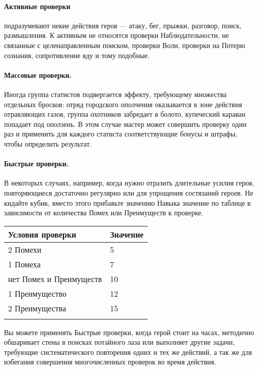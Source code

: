 \paragraph{Активные проверки} подразумевают некие действия героя — атаку, бег, прыжки, разговор, поиск, размышления. К активным не относятся проверки Наблюдательности, не связанные с целенаправленным поиском, проверки Воли, проверки на Потерю сознания, сопротивление яду и тому подобные.
{\paragraph{Массовые проверки.} Иногда группа статистов подвергается эффекту, требующему множества отдельных бросков: отряд городского ополчения оказывается в зоне действия отравляющих газов, группа охотников забредает в болото, купеческий караван попадает под оползень. В этом случае мастер может совершить проверку один раз и применить для каждого статиста соответствующие бонусы и штрафы, чтобы определить результат.
\paragraph{Быстрые проверки.} В некоторых случаях, например, когда нужно отразить длительные усилия героя, повторяющиеся достаточно регулярно или для упрощения состязаний героев. Не кидайте кубик, вместо этого прибавьте значению Навыка значение по таблице в зависимости от количества Помех или Преимуществ к проверке.
\begin{center}
\begin{tabular}{|l|l|}
\hline
Условия проверки & Значение \\ \hline
2 Помехи & 5 \\ \hline
1 Помеха & 7 \\ \hline
нет Помех и Преимуществ & 10 \\ \hline
1 Преимущество & 12 \\ \hline
2 Преимущества & 15 \\ \hline
\\ \hline
\end{tabular}
\end{center}
Вы можете применять Быстрые проверки, когда герой стоит на часах, методично обшаривает стены в поисках потайного лаза или выполняет другие задачи, требующие систематического повторения одних и тех же действий, а так же для избегания совершения многочисленных проверок во время действия.
}

